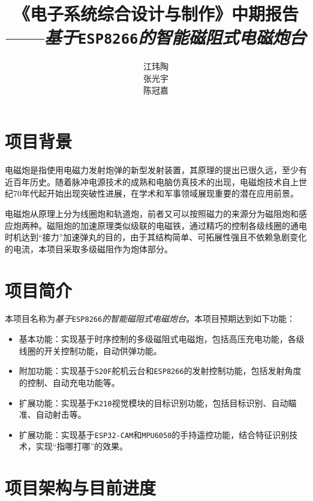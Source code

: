 \documentclass{article}
\title{《电子系统综合设计与制作》中期报告\\——\textit{基于}\texttt{ESP8266}\textit{的智能磁阻式电磁炮台}}
\author{江玮陶\quad 2023010631\\张光宇\quad 2023010629\\陈冠嘉\quad 2023010503}
\begin{document}
\maketitle
\tableofcontents
\section{项目背景}
电磁炮是指使用电磁力发射炮弹的新型发射装置，其原理的提出已很久远，至少有近百年历史。随着脉冲电源技术的成熟和电脑仿真技术的出现，电磁炮技术自上世纪70年代起开始出现突破性进展，在学术和军事领域展现重要的潜在应用前景。

电磁炮从原理上分为线圈炮和轨道炮，前者又可以按照磁力的来源分为磁阻炮和感应炮两种。磁阻炮的加速原理类似级联的电磁铁，通过精巧的控制各级线圈的通电时机达到“接力”加速弹丸的目的，由于其结构简单、可拓展性强且不依赖急剧变化的电流，本项目采取多级磁阻作为炮体部分。

\section{项目简介}
本项目名称为\textit{基于}\texttt{ESP8266}\textit{的智能磁阻式电磁炮台}。本项目预期达到如下功能：
\begin{itemize}
    \item 基本功能：实现基于时序控制的多级磁阻式电磁炮，包括高压充电功能，各级线圈的开关控制功能，自动供弹功能。
    \item 附加功能：实现基于\texttt{S20F}舵机云台和\texttt{ESP8266}的发射控制功能，包括发射角度的控制、自动充电功能等。
    \item 扩展功能：实现基于\texttt{K210}视觉模块的目标识别功能，包括目标识别、自动瞄准、自动射击等。
    \item 扩展功能：实现基于\texttt{ESP32-CAM}和\texttt{MPU6050}的手持遥控功能，结合特征识别技术，实现“指哪打哪”的效果。
\end{itemize}
\section{项目架构与目前进度}
\end{document}
